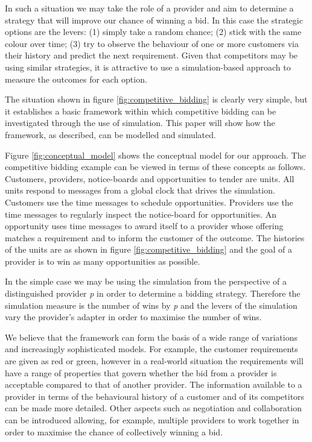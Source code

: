\documentclass[10pt,numbers]{sigplanconf}
\begin{document}
In such a situation we may take the role of a provider and aim to determine a strategy that will improve our chance of winning a bid. In this case the strategic options are the levers: (1) simply take a random chance; (2) stick with the same colour over time; (3) try to observe the behaviour of one or more customers via their history and predict the next requirement. Given that competitors may be using similar strategies, it is attractive to use a simulation-based approach to measure the outcomes for each option.

The situation shown in figure \ref{fig:competitive_bidding} is clearly very simple, but it establishes a basic framework within which competitive bidding can be investigated through the use of simulation. This paper will show how the framework, as described, can be modelled and simulated. 

Figure \ref{fig:conceptual_model} shows the conceptual model for our approach. The competitive bidding example can be viewed in terms of these concepts as follows. Customers, providers, notice-boards and opportunities to tender are units. All units respond to messages from a global clock that drives the simulation. Customers use the time messages to schedule opportunities. Providers use the time messages to regularly inspect the notice-board for opportunities. An opportunity uses time messages to award itself to a provider whose offering matches a requirement and to inform the customer of the outcome. The histories of the units are as shown in figure \ref{fig:competitive_bidding} and the goal of a provider is to win as many opportunities as possible.

In the simple case we may be using the simulation from the perspective of a distinguished provider {\it p} in order to determine a bidding strategy. Therefore the simulation measure is the number of wins by {\it p} and the levers of the simulation vary the provider's adapter in order to maximise the number of wins.

We believe that the framework can form the basis of a wide range of variations and increasingly sophisticated models. For example, the customer requirements are given as red or green, however in a real-world situation the requirements will have a range of properties that govern whether the bid from a provider is acceptable compared to that of another provider. The information available to a provider in terms of the behavioural history of a customer and of its competitors can be made more detailed. Other aspects such as negotiation and collaboration can be introduced allowing, for example, multiple providers to work together in order to maximise the chance of collectively winning a bid.
\end{document}
